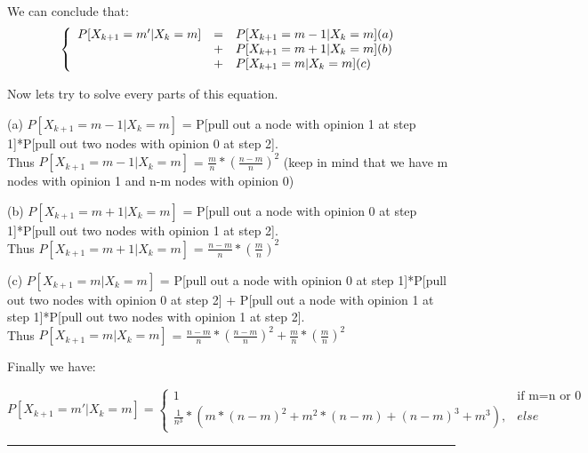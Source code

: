 \documentclass[11pt]{article}
\begin{document}
\noindent We can conclude that:
\begin{equation}
    \left \{
        \begin{array}{r c l}
            P[X_{k+1} = m'|X_{k} = m] & = & P[X_{k+1} = m-1|X_{k} = m] (a)\\
            & + &  P[X_{k+1} = m+1|X_{k} = m](b)\\
            & + &  P[X_{k+1} = m|X_{k} = m](c)
        \end{array}
        \right .
\end{equation}

\noindent Now lets try to solve every parts of this equation.

(a) $P[X_{k+1} = m-1|X_{k} = m]$ = P[pull out a node with opinion 1 at step 1]*P[pull out two nodes with opinion 0 at step 2]. \\
Thus $P[X_{k+1} = m-1|X_{k} = m]$ = $\frac{m}{n}*(\frac{n-m}{n})^{2}$ (keep in mind that we have m nodes with opinion 1 and n-m nodes with opinion 0)

(b) $P[X_{k+1} = m+1|X_{k} = m]$ = P[pull out a node with opinion 0 at step 1]*P[pull out two nodes with opinion 1 at step 2]. \\
Thus $P[X_{k+1} = m+1|X_{k} = m]$ = $\frac{n-m}{n}*(\frac{m}{n})^{2}$

(c) $P[X_{k+1} = m|X_{k} = m]$ = P[pull out a node with opinion 0 at step 1]*P[pull out two nodes with opinion 0 at step 2] + P[pull out a node with opinion 1 at step 1]*P[pull out two nodes with opinion 1 at step 2]. \\
Thus $P[X_{k+1} = m|X_{k} = m]$ = $\frac{n-m}{n}*(\frac{n-m}{n})^{2} + \frac{m}{n}*(\frac{m}{n})^{2}$

\vspace{5mm}

\noindent Finally we have: 

\begin{equation}
    P[X_{k+1} = m'|X_{k} = m]=
    \begin{cases}
        1 & \text{if m=n or 0}\\
        \frac{1}{n^{3}}*(m*(n-m)^{2} + m^{2}*(n-m) + (n-m)^{3} + m^{3}), & else
    \end{cases}
\end{equation}


\begin{center}
    \noindent\rule{8cm}{0.4pt} 
\end{center}

\vspace{5mm}
\end{document}
